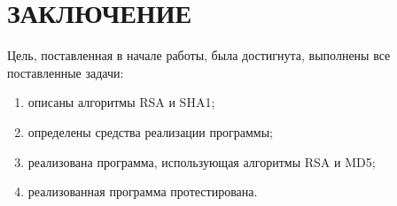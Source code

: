 \chapter*{ЗАКЛЮЧЕНИЕ}

Цель, поставленная в начале работы, была достигнута, выполнены все поставленные задачи:
\begin{enumerate}
	\item описаны алгоритмы RSA и SHA1;
	\item определены средства реализации программы;
	\item реализована программа, использующая алгоритмы RSA и MD5;
	\item реализованная программа протестирована.
\end{enumerate}
